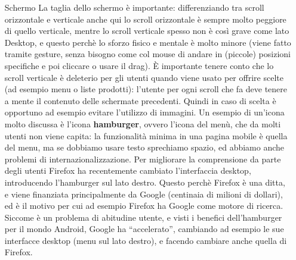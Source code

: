 \begin{enumerate}
\item[Schermo] La taglia dello schermo \`e importante: differenziando tra scroll orizzontale e verticale anche qui lo scroll orizzontale \`e sempre molto peggiore di quello verticale, mentre lo scroll verticale spesso non \`e cos\`i grave come lato Desktop, e questo perch\`e lo sforzo fisico e mentale \`e molto minore (viene fatto tramite gesture, senza bisogno come col mouse di andare in (piccole) posizioni specifiche e poi cliccare o usare il drag). \`E importante tenere conto che lo scroll verticale \`e deleterio per gli utenti quando viene usato per offrire scelte (ad esempio menu o liste prodotti): l'utente per ogni scroll che fa deve tenere a mente il contenuto delle schermate precedenti. Quindi in caso di scelta \`e opportuno ad esempio evitare l'utilizzo di immagini. Un esempio di un'icona molto discussa \`e l'icona \textbf{hamburger}, ovvero l'icona del men\`u, che da molti utenti non viene capita: la funzionalit\`a minima in una pagina mobile \`e quella del menu, ma se dobbiamo usare testo sprechiamo spazio, ed abbiamo anche problemi di internazionalizzazione. Per migliorare la comprensione da parte degli utenti Firefox ha recentemente cambiato l'interfaccia desktop, introducendo l'hamburger sul lato destro. Questo perch\`e Firefox \`e una ditta, e viene finanziata principalmente da Google (centinaia di milioni di dollari), ed \`e il motivo per cui ad esempio Firefox ha Google come motore di ricerca. Siccome \`e un problema di abitudine utente, e visti i benefici dell'hamburger per il mondo Android, Google ha ``accelerato'', cambiando ad esempio le sue interfacce desktop (menu sul lato destro), e facendo cambiare anche quella di Firefox.
  
\end{enumerate}
